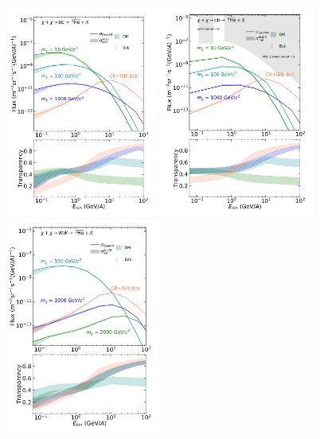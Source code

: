 \begin{figure}[hbtp]
    \centering
    \includegraphics[width=0.45\textwidth]{figures/he3bar_bb_LIS.png}
    \includegraphics[width=0.45\textwidth]{figures/he3bar_bb_SM.png}
    \includegraphics[width=0.45\textwidth]{figures/he3bar_WW_LIS.png}

\end{figure}
